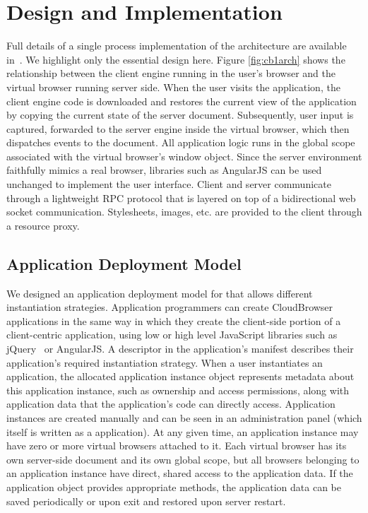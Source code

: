 \section{Design and Implementation}
\label{sec:implementation}

Full details of a single process implementation of the \cb architecture
are available in~\cite{mcdaniel2012cloudbrowser}.  We highlight only the
essential design here.  Figure \ref{fig:cb1arch} shows the relationship 
between the client engine running in the user's browser and the virtual browser
running server side.  When the user visits the application, the client engine
code is downloaded and restores the current view of the application by
copying the current state of the server document.  Subsequently, user input 
is captured, forwarded to the server engine inside the virtual browser, 
which then dispatches events to the document.  All application logic runs
in the global scope associated with the virtual browser's window object.
Since the server environment faithfully mimics a real browser, libraries
such as AngularJS can be used unchanged to implement the user interface.
Client and server communicate through a lightweight RPC protocol that is 
layered on top of a bidirectional web socket communication. 
Stylesheets, images, etc. are provided to the client through a resource
proxy.

\subsection{Application Deployment Model}
\label{sec:appmodel}

We designed an application deployment model for \cbtwo{} that allows different
instantiation strategies.
Application programmers can create CloudBrowser applications in the same way in which 
they create the client-side portion of a client-centric application, using low or high level
JavaScript libraries such as jQuery~\cite{jquery} or AngularJS.  A descriptor in the application's
manifest describes their application's required instantiation strategy.
When a user instantiates an application, the allocated application instance object 
represents metadata about this application
instance, such as ownership and access permissions, along with application data that
the application's code can directly access.  Application instances are created manually
and can be seen in an administration panel (which itself is written as a \cb application).
At any given time, an application instance may have zero or more virtual browsers attached 
to it.  Each virtual browser has its own server-side document and its own global scope, 
but all browsers belonging to an application instance have direct, shared access to the 
application data.  If the application object provides appropriate methods, the application 
data can be saved periodically or upon exit and restored upon server restart.

